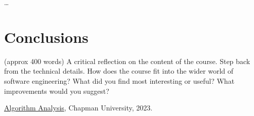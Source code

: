 \documentclass{article}
\theoremstyle{theorem}
\theoremstyle{definition}
\theoremstyle{remark}
\begin{document}
 
\ldots

\section{Conclusions}\label{conclusions}

(approx 400 words) A critical reflection on the content of the course. Step back from the technical details. How does the course fit into the wider world of software engineering? What did you find most interesting or useful? 
What improvements would you suggest?

\begin{thebibliography}{99}
 \href{https://github.com/alexhkurz/algorithm-analysis-2023}{Algorithm Analysis}, Chapman University, 2023.
\end{thebibliography}
\end{document}
